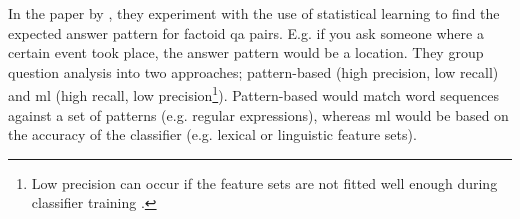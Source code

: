 In the paper by \citet{TobaAdrianiManurung2011}, they experiment with the use of statistical 
learning to find the expected answer pattern for factoid \gls{qa} pairs. E.g. if you ask 
someone where a certain event took place, the answer pattern would be a location. They group question analysis into two approaches; pattern-based (high precision, low recall) and \gls{ml} 
(high recall, low precision\footnote{Low precision can occur if the feature sets are not fitted 
	well enough during 
	classifier training \cite[p.~283]{TobaAdrianiManurung2011}.}). Pattern-based would match 
word sequences against a set of patterns (e.g. regular expressions), whereas \gls{ml} would be 
based on the accuracy of the classifier (e.g. lexical or linguistic feature sets). 
\begin{comment}
The retrieval of \gls{qa} pairs is done by using a statistical relation framework: Bayesian 
Analogical Reasoning (BAR). Features sets are then extracted from the training set by use of binary 
values checking if the question contains a given question word. The BAR framework then learns the 
related features and computes the estimation for them. Thereafter \gls{qa} pairs are retrieved from 
the testing set and compared against the training set. Afterwards, the \gls{qa} pairs that have 
identical question words are identified, and overlapping pairs are grouped according their named 
entity group.

To retrieve named entities, they used two different recognizers. The first was Stanford (extracts the
person, organization and location), and the second was dictionary based (extract number
entities and fine-grained noun-based entities). 

Question words were extracted by building a question word list from the training set (achieved 
by using Stanford Part-of-Speech (POS) tagger). Then for each question, look for the appearance 
of the question word to create the feature set.

Mapped named-entities; e.g. ORGANIZATION became NEorganization.

\end{comment}

